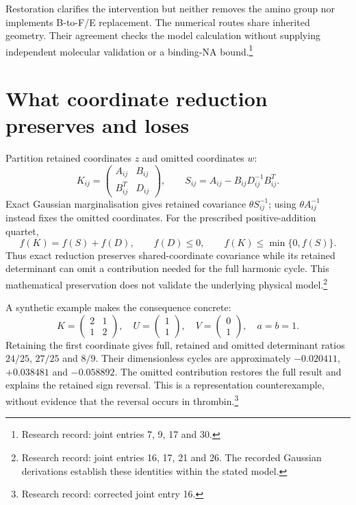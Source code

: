 \documentclass{article}
\begin{document}
Restoration clarifies the intervention but neither removes the amino group nor implements B-to-F/E replacement. The numerical routes share inherited geometry. Their agreement checks the model calculation without supplying independent molecular validation or a binding-NA bound.\footnote{Research record: joint entries 7, 9, 17 and 30.}

\section{What coordinate reduction preserves and loses}
Partition retained coordinates \(z\) and omitted coordinates \(w\):
\[
 K_{ij}=\begin{pmatrix}A_{ij}&B_{ij}\\B_{ij}^T&D_{ij}\end{pmatrix},
 \qquad S_{ij}=A_{ij}-B_{ij}D_{ij}^{-1}B_{ij}^T.
\]
Exact Gaussian marginalisation gives retained covariance \(\theta S_{ij}^{-1}\); using \(\theta A_{ij}^{-1}\) instead fixes the omitted coordinates. For the prescribed positive-addition quartet,
\[
 f(K)=f(S)+f(D),\qquad f(D)\le0,
 \qquad f(K)\le\min\{0,f(S)\}.
\]
Thus exact reduction preserves shared-coordinate covariance while its retained determinant can omit a contribution needed for the full harmonic cycle. This mathematical preservation does not validate the underlying physical model.\footnote{Research record: joint entries 16, 17, 21 and 26. The recorded Gaussian derivations establish these identities within the stated model.}

A synthetic example makes the consequence concrete:
\[
 K=\begin{pmatrix}2&1\\1&2\end{pmatrix},\quad
 U=\begin{pmatrix}1\\1\end{pmatrix},\quad
 V=\begin{pmatrix}0\\1\end{pmatrix},\quad a=b=1.
\]
Retaining the first coordinate gives full, retained and omitted determinant ratios \(24/25\), \(27/25\) and \(8/9\). Their dimensionless cycles are approximately \(-0.020411\), \(+0.038481\) and \(-0.058892\). The omitted contribution restores the full result and explains the retained sign reversal. This is a representation counterexample, without evidence that the reversal occurs in thrombin.\footnote{Research record: corrected joint entry 16.}
\end{document}
